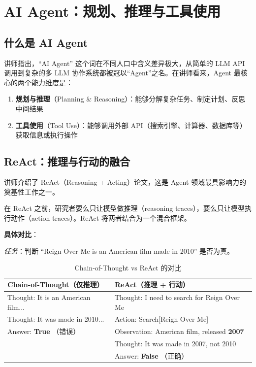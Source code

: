 \section{AI Agent：规划、推理与工具使用}

\subsection{什么是 AI Agent}

讲师指出，``AI Agent'' 这个词在不同人口中含义差异极大，从简单的 LLM API 调用到复杂的多 LLM 协作系统都被冠以``Agent''之名。在讲师看来，Agent 最核心的两个能力维度是：

\begin{enumerate}
    \item \textbf{规划与推理}（Planning \& Reasoning）：能够分解复杂任务、制定计划、反思中间结果
    \item \textbf{工具使用}（Tool Use）：能够调用外部 API（搜索引擎、计算器、数据库等）获取信息或执行操作
\end{enumerate}

\subsection{ReAct：推理与行动的融合}

讲师介绍了 ReAct（Reasoning + Acting）论文，这是 Agent 领域最具影响力的奠基性工作之一。

在 ReAct 之前，研究者要么只让模型做推理（reasoning traces），要么只让模型执行动作（action traces）。ReAct 将两者结合为一个混合框架。

\textbf{具体对比}：

\textit{任务}：判断 ``Reign Over Me is an American film made in 2010'' 是否为真。

\begin{table}[H]
\centering
\begin{tabular}{p{6cm}p{6cm}}
\toprule
\textbf{Chain-of-Thought（仅推理）} & \textbf{ReAct（推理 + 行动）} \\
\midrule
Thought: It is an American film... & Thought: I need to search for Reign Over Me \\
Thought: It was made in 2010... & Action: Search{[}Reign Over Me{]} \\
Answer: \textbf{True} {\color{red}（错误）} & Observation: American film, released \textbf{2007} \\
 & Thought: It was made in 2007, not 2010 \\
 & Answer: \textbf{False} {\color{green!60!black}（正确）} \\
\bottomrule
\end{tabular}
\caption{Chain-of-Thought vs ReAct 的对比}
\end{table}

